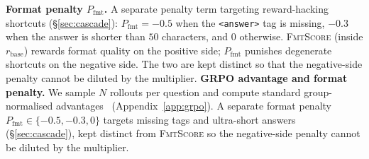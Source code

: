\documentclass[11pt]{article}
\begin{document}
\textbf{Format penalty $P_{\text{fmt}}$.}
A separate penalty term targeting reward-hacking
shortcuts (\S\ref{sec:cascade}):
$P_{\text{fmt}}=-0.5$ when the \texttt{<answer>} tag is
missing, $-0.3$ when the answer is shorter than $50$
characters, and $0$ otherwise. \textsc{FmtScore}
(inside $r_{\text{base}}$) rewards format quality on
the positive side; $P_{\text{fmt}}$ punishes degenerate
shortcuts on the negative side. The two are kept
distinct so that the negative-side penalty cannot be
diluted by the multiplier.
\textbf{GRPO advantage and format penalty.}
We sample $N$ rollouts per question and compute 
standard group-normalised 
advantages~\citep{shao2024deepseekmath} 
(Appendix~\ref{app:grpo}). A separate format penalty 
$P_{\text{fmt}}\!\in\!\{-0.5, -0.3, 0\}$ targets 
missing tags and ultra-short answers 
(\S\ref{sec:cascade}), kept distinct from 
\textsc{FmtScore} so the negative-side penalty 
cannot be diluted by the multiplier.




\end{document}
